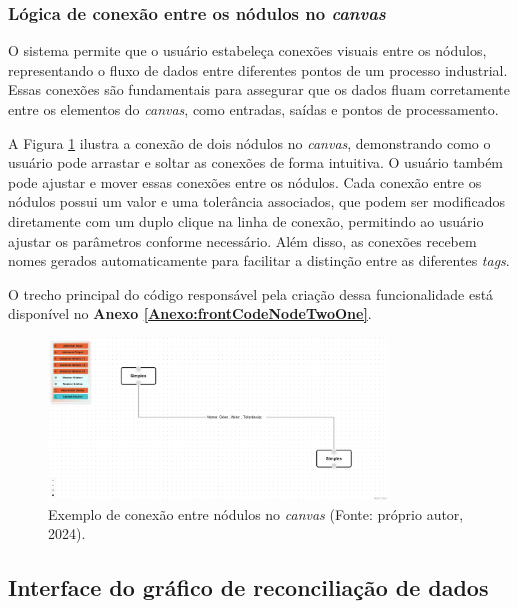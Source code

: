 \subsubsection{Lógica de conexão entre os nódulos no \textit{canvas}}

O sistema permite que o usuário estabeleça conexões visuais entre os nódulos, representando o fluxo de dados entre diferentes pontos de um processo industrial. Essas conexões são fundamentais para assegurar que os dados fluam corretamente entre os elementos do \textit{canvas}, como entradas, saídas e pontos de processamento.

A Figura \ref{Fig:NodeConnections} ilustra a conexão de dois nódulos no \textit{canvas}, demonstrando como o usuário pode arrastar e soltar as conexões de forma intuitiva. O usuário também pode ajustar e mover essas conexões entre os nódulos. Cada conexão entre os nódulos possui um valor e uma tolerância associados, que podem ser modificados diretamente com um duplo clique na linha de conexão, permitindo ao usuário ajustar os parâmetros conforme necessário. Além disso, as conexões recebem nomes gerados automaticamente para facilitar a distinção entre as diferentes \textit{tags}.

O trecho principal do código responsável pela criação dessa funcionalidade está disponível no \textbf{Anexo \ref{Anexo:frontCodeNodeTwoOne}}.

\begin{figure}[htbp]
    \centering
    \includegraphics[width=0.8\textwidth]{figuras/node-connection-example.png}
    \caption{Exemplo de conexão entre nódulos no \textit{canvas} (Fonte: próprio autor, 2024).}
    \label{Fig:NodeConnections}
\end{figure}

\subsection{Interface do gráfico de reconciliação de dados}

